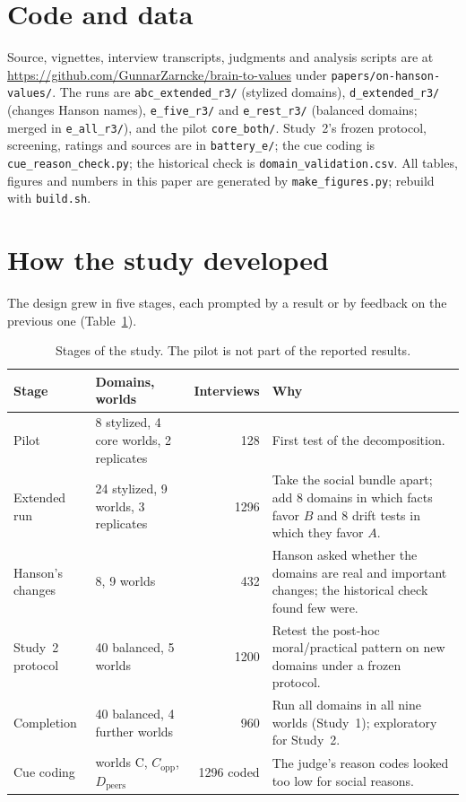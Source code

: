 \documentclass[11pt]{article}
\begin{document}
\section*{Code and data}

{\sloppy Source, vignettes, interview transcripts, judgments and analysis scripts are at
\url{https://github.com/GunnarZarncke/brain-to-values}
under \texttt{papers/on-hanson-values/}.
The runs are \texttt{abc\_extended\_r3/} (stylized domains), \texttt{d\_extended\_r3/} (changes Hanson names), \texttt{e\_five\_r3/} and \texttt{e\_rest\_r3/} (balanced domains; merged in \texttt{e\_all\_r3/}), and the pilot \texttt{core\_both/}.
Study~2's frozen protocol, screening, ratings and sources are in \texttt{battery\_e/}; the cue coding is \texttt{cue\_reason\_check.py}; the historical check is \texttt{domain\_validation.csv}.
All tables, figures and numbers in this paper are generated by \texttt{make\_figures.py}; rebuild with \texttt{build.sh}.\par}




\appendix

\section{How the study developed}
\label{app:history}

The design grew in five stages, each prompted by a result or by feedback on the previous one (Table~\ref{tab:stages}).

\begin{table}[h]
\centering\footnotesize
\begin{tabularx}{\linewidth}{@{}l>{\raggedright}p{2.6cm}r>{\raggedright\arraybackslash}X@{}}
\toprule
Stage & Domains, worlds & Interviews & Why \\
\midrule
Pilot & 8 stylized, 4 core worlds, 2 replicates & 128 & First test of the decomposition. \\
Extended run & 24 stylized, 9 worlds, 3 replicates & 1296 & Take the social bundle apart; add 8 domains in which facts favor $B$ and 8 drift tests in which they favor $A$. \\
Hanson's changes & 8, 9 worlds & 432 & Hanson asked whether the domains are real and important changes; the historical check found few were. \\
Study~2 protocol & 40 balanced, 5 worlds & 1200 & Retest the post-hoc moral/practical pattern on new domains under a frozen protocol. \\
Completion & 40 balanced, 4 further worlds & 960 & Run all domains in all nine worlds (Study~1); exploratory for Study~2. \\
Cue coding & worlds C, $C_{\text{opp}}$, $D_{\text{peers}}$ & 1296 coded & The judge's reason codes looked too low for social reasons. \\
\bottomrule
\end{tabularx}
\caption{Stages of the study. The pilot is not part of the reported results.}
\label{tab:stages}
\end{table}
\end{document}
